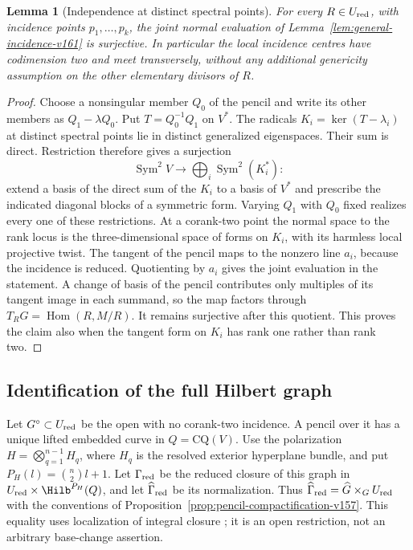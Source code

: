 \documentclass[11pt,reqno]{amsart}
\numberwithin{equation}{section}
\newtheorem{lemma}[theorem]{Lemma}
\theoremstyle{definition}\newtheorem{definition}[theorem]{Definition}
\theoremstyle{remark}\newtheorem{remark}[theorem]{Remark}
\DeclareMathOperator{\Sym}{Sym}\DeclareMathOperator{\Gr}{Gr}
\DeclareMathOperator{\Hom}{Hom}\DeclareMathOperator{\Tot}{Tot}
\begin{document}
\begin{lemma}[Independence at distinct spectral points]
\label{lem:independent-radicals-v161}
For every $R\in U_{\rm red}$, with incidence points $p_1,\ldots,p_k$,
the joint normal evaluation of Lemma~\ref{lem:general-incidence-v161}
is surjective. In particular the local incidence centres have
codimension two and meet transversely, without any additional genericity
assumption on the other elementary divisors of $R$.
\end{lemma}
\begin{proof}
Choose a nonsingular member $Q_0$ of the pencil and write its other
members as $Q_1-\lambda Q_0$. Put $T=Q_0^{-1}Q_1$ on $V^*$.
The radicals $K_i=\ker(T-\lambda_i)$ at distinct spectral points
lie in distinct generalized eigenspaces. Their sum is direct.
Restriction therefore gives a surjection
\[
 \Sym^2V\longrightarrow\bigoplus_i\Sym^2(K_i^*):
\]
extend a basis of the direct sum of the $K_i$ to a basis of $V^*$ and
prescribe the indicated diagonal blocks of a symmetric form.
Varying $Q_1$ with $Q_0$ fixed realizes every one of these restrictions.
At a corank-two point the normal space to the rank locus is the
three-dimensional space of forms on $K_i$, with its harmless local
projective twist. The tangent of the pencil maps to the nonzero line
$a_i$, because the incidence is reduced. Quotienting by $a_i$ gives
the joint evaluation in the statement. A change of basis of the
pencil contributes only multiples of its tangent image in each
summand, so the map factors through $T_RG=\Hom(R,M/R)$. It remains
surjective after this quotient. This proves the claim also when the
tangent form on $K_i$ has rank one rather than rank two.
\end{proof}

\subsection{Identification of the full Hilbert graph}
Let $G^\circ\subset U_{\rm red}$ be the open with no corank-two
incidence. A pencil over it has a unique lifted embedded curve in
$Q=\mathrm{CQ}(V)$. Use the polarization
$H=\bigotimes_{q=1}^{n-1}H_q$, where $H_q$ is the resolved exterior
hyperplane bundle, and put $P_H(l)=\binom n2 l+1$.
Let $\Gamma_{\rm red}$ be the reduced closure of this graph in
$U_{\rm red}\times\Hilb^{P_H}(Q)$, and let
$\widehat\Gamma_{\rm red}$ be its normalization. Thus
$\widehat\Gamma_{\rm red}=\widehat G\times_G U_{\rm red}$ with the
conventions of Proposition~\ref{prop:pencil-compactification-v157}.
This equality uses localization of integral closure
\cite[Section~29.55, Lemmas~29.55.3--4]{Stacks161}; it is an open
restriction, not an arbitrary base-change assertion.
\end{document}
